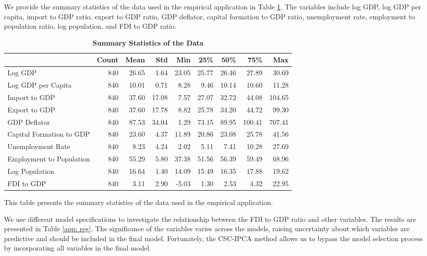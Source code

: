 \documentclass[12pt]{article}
\begin{document}
We provide the summary statistics of the data used in the empirical application in Table \ref{app: data summary}. The variables include log GDP, log GDP per capita, import to GDP ratio, export to GDP ratio, GDP deflator, capital formation to GDP ratio, unemployment rate, employment to population ratio, log population, and FDI to GDP ratio. 
\begin{table}[!ht]
    \centering
    \footnotesize
    \caption{\textbf{Summary Statistics of the Data}}
    \label{app: data summary}
    \begin{tabular}{lrrrrrrrr}
        \toprule
         & Count & Mean & Std & Min & 25\% & 50\% & 75\% & Max \\
        \midrule
        Log GDP & 840 & 26.65 & 1.64 & 23.05 & 25.77 & 26.46 & 27.89 & 30.69 \\
        Log GDP per Capita & 840 & 10.01 & 0.71 & 8.28 & 9.46 & 10.14 & 10.60 & 11.28 \\
        Import to GDP & 840 & 37.60 & 17.08 & 7.57 & 27.07 & 32.72 & 44.08 & 104.65 \\
        Export to GDP & 840 & 37.60 & 17.78 & 8.82 & 25.78 & 34.20 & 44.72 & 99.30 \\
        GDP Deflator & 840 & 87.53 & 34.04 & 1.29 & 73.15 & 89.95 & 100.41 & 707.41 \\
        Capital Formation to GDP & 840 & 23.60 & 4.37 & 11.89 & 20.86 & 23.08 & 25.78 & 41.56 \\
        Unemployment Rate & 840 & 8.23 & 4.24 & 2.02 & 5.11 & 7.41 & 10.28 & 27.69 \\
        Employment to Population & 840 & 55.29 & 5.80 & 37.38 & 51.56 & 56.39 & 59.49 & 68.96 \\
        Log Population & 840 & 16.64 & 1.40 & 14.09 & 15.49 & 16.35 & 17.88 & 19.62 \\
        FDI to GDP & 840 & 3.11 & 2.90 & -5.03 & 1.30 & 2.53 & 4.32 & 22.95 \\
        \bottomrule
        \end{tabular}
    \begin{tablenotes}
        \item This table presents the summary statistics of the data used in the empirical application.
    \end{tablenotes}
    \end{table}

We use different model specifications to investigate the relationship between the FDI to GDP ratio and other variables. The results are presented in Table \ref{app: reg}. The significance of the variables varies across the models, raising uncertainty about which variables are predictive and should be included in the final model. Fortunately, the CSC-IPCA method allows us to bypass the model selection process by incorporating all variables in the final model.
\end{document}
